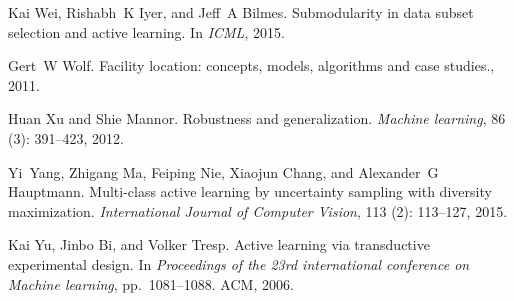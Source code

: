 \documentclass{article} %
\begin{document}
\begin{thebibliography}{51}
Kai Wei, Rishabh~K Iyer, and Jeff~A Bilmes.
\newblock Submodularity in data subset selection and active learning.
\newblock In \emph{ICML}, 2015.

Gert~W Wolf.
\newblock Facility location: concepts, models, algorithms and case studies.,
  2011.

Huan Xu and Shie Mannor.
\newblock Robustness and generalization.
\newblock \emph{Machine learning}, 86 (3): 391--423, 2012.

Yi~Yang, Zhigang Ma, Feiping Nie, Xiaojun Chang, and Alexander~G Hauptmann.
\newblock Multi-class active learning by uncertainty sampling with diversity
  maximization.
\newblock \emph{International Journal of Computer Vision}, 113
  (2): 113--127, 2015.

Kai Yu, Jinbo Bi, and Volker Tresp.
\newblock Active learning via transductive experimental design.
\newblock In \emph{Proceedings of the 23rd international conference on Machine
  learning}, pp.\  1081--1088. ACM, 2006.

\end{thebibliography}


\appendix
\end{document}
